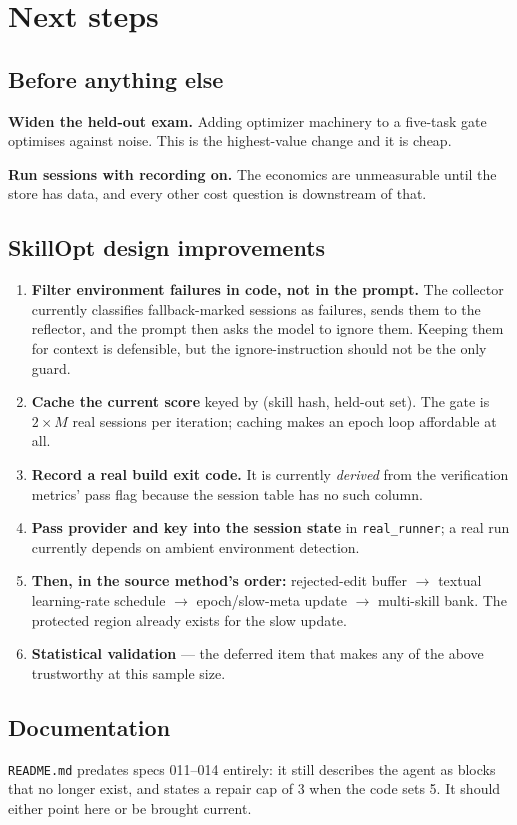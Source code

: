 \documentclass[11pt,a4paper]{article}
\begin{document}
\section{Next steps}

\subsection{Before anything else}

\textbf{Widen the held-out exam.} Adding optimizer machinery to a five-task gate
optimises against noise. This is the highest-value change and it is cheap.

\textbf{Run sessions with recording on.} The economics are unmeasurable until the
store has data, and every other cost question is downstream of that.

\subsection{SkillOpt design improvements}

\begin{enumerate}[leftmargin=1.4em]
  \item \textbf{Filter environment failures in code, not in the prompt.} The
  collector currently classifies fallback-marked sessions as failures, sends them to
  the reflector, and the prompt then asks the model to ignore them. Keeping them for
  context is defensible, but the ignore-instruction should not be the only guard.
  \item \textbf{Cache the current score} keyed by (skill hash, held-out set). The
  gate is $2 \times M$ real sessions per iteration; caching makes an epoch loop
  affordable at all.
  \item \textbf{Record a real build exit code.} It is currently \emph{derived} from
  the verification metrics' pass flag because the session table has no such column.
  \item \textbf{Pass provider and key into the session state} in
  \texttt{real\_runner}; a real run currently depends on ambient environment
  detection.
  \item \textbf{Then, in the source method's order:} rejected-edit buffer $\to$
  textual learning-rate schedule $\to$ epoch/slow-meta update $\to$ multi-skill
  bank. The protected region already exists for the slow update.
  \item \textbf{Statistical validation} --- the deferred item that makes any of the
  above trustworthy at this sample size.
\end{enumerate}

\subsection{Documentation}

\texttt{README.md} predates specs 011--014 entirely: it still describes the agent as
blocks that no longer exist, and states a repair cap of 3 when the code sets 5. It
should either point here or be brought current.
\end{document}
